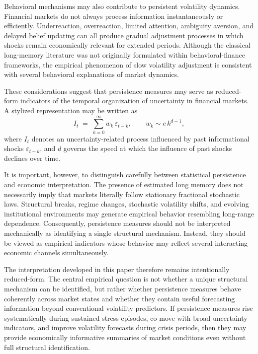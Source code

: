 \documentclass[unnumsec,webpdf,contemporary,large]{oup-authoring-template}%
\theoremstyle{thmstyleone}%
\theoremstyle{thmstyletwo}%
\theoremstyle{thmstylethree}%
\begin{document}
Behavioral mechanisms may also contribute to persistent volatility
dynamics. Financial markets do not always process information
instantaneously or efficiently. Underreaction, overreaction, limited
attention, ambiguity aversion, and delayed belief updating can all produce
gradual adjustment processes in which shocks remain economically relevant
for extended periods. Although the classical long-memory literature was not
originally formulated within behavioral-finance frameworks, the empirical
phenomenon of slow volatility adjustment is consistent with several
behavioral explanations of market dynamics.

These considerations suggest that persistence measures may serve as
reduced-form indicators of the temporal organization of uncertainty in
financial markets. A stylized representation may be written as
\begin{equation}
  I_t \;=\; \sum_{k=0}^{\infty} w_k\, \varepsilon_{t-k}, \qquad
  w_k \sim c\, k^{d-1},
  \label{eq:info-persistence}
\end{equation}
where $I_t$ denotes an uncertainty-related process influenced by past
informational shocks $\varepsilon_{t-k}$, and $d$ governs the speed at
which the influence of past shocks declines over time.

It is important, however, to distinguish carefully between statistical
persistence and economic interpretation. The presence of estimated long
memory does not necessarily imply that markets literally follow stationary
fractional stochastic laws. Structural breaks, regime changes, stochastic
volatility shifts, and evolving institutional environments may generate
empirical behavior resembling long-range dependence. Consequently,
persistence measures should not be interpreted mechanically as identifying
a single structural mechanism. Instead, they should be viewed as empirical
indicators whose behavior may reflect several interacting economic channels
simultaneously.

The interpretation developed in this paper therefore remains intentionally
reduced-form. The central empirical question is not whether a unique
structural mechanism can be identified, but rather whether persistence
measures behave coherently across market states and whether they contain
useful forecasting information beyond conventional volatility predictors.
If persistence measures rise systematically during sustained stress
episodes, co-move with broad uncertainty indicators, and improve volatility
forecasts during crisis periods, then they may provide economically
informative summaries of market conditions even without full structural
identification.
\end{document}
